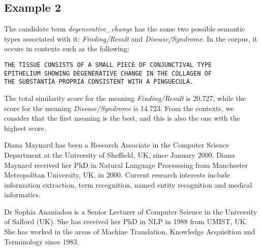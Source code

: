 \subsection{Example 2}
The candidate term {\it degenerative\_change} has the same two possible
semantic types associated with it: {\it Finding/Result} and {\it Disease/Syndrome}. In the corpus, it occurs in contexts such as the following:
\begin{verbatim}
THE TISSUE CONSISTS OF A SMALL PIECE OF CONJUNCTIVAL TYPE 
EPITHELIUM SHOWING DEGENERATIVE CHANGE IN THE COLLAGEN OF 
THE SUBSTANTIA PROPRIA CONSISTENT WITH A PINGUECULA.     
\end{verbatim}
The total similarity score for the meaning {\it Finding/Result} is
20.727, while the score for the meaning {\it Disease/Syndrome} is
14.723. From the contexts, we consider that the first meaning is the
best, and this is also the one with the highest score.




\begin{biography}

\biotitle{}


{Diana Maynard has been a Research Associate in the Computer Science
Department at the University of Sheffield, UK, since January 2000.
Diana Maynard received her PhD in Natural Language Processsing from
Manchester Metropolitan University, UK, in 2000. Current research
interests include information extraction, term recognition, named entity recognition and medical informatics.}

{Dr Sophia Ananiadou is a Senior Lecturer of Computer Science in the University of Salford (UK). She has received her PhD in NLP in 1988 from UMIST, UK. She has worked in the areas of Machine Translation, Knowledge Acquisition and Terminology since 1983. 
}


\newpage
\
\thispagestyle{empty}

\end{biography}


